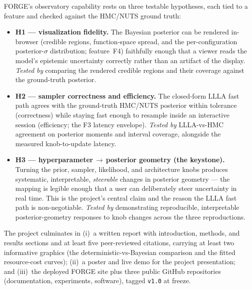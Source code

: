 \documentclass[11pt]{article}
\begin{document}
FORGE's observatory capability rests on three testable hypotheses, each tied to a feature and checked against the HMC/NUTS ground truth:
\begin{itemize}[nosep,leftmargin=1.4em]
  \item \textbf{H1 --- visualization fidelity.} The Bayesian posterior can be rendered in-browser (credible regions, function-space spread, and the per-configuration posterior-$\sigma$ distribution; feature~F4) faithfully enough that a viewer reads the model's epistemic uncertainty correctly rather than an artifact of the display. \emph{Tested by} comparing the rendered credible regions and their coverage against the ground-truth posterior.
  \item \textbf{H2 --- sampler correctness and efficiency.} The closed-form LLLA fast path agrees with the ground-truth HMC/NUTS posterior within tolerance (correctness) while staying fast enough to resample inside an interactive session (efficiency; the F3 latency envelope). \emph{Tested by} LLLA-vs-HMC agreement on posterior moments and interval coverage, alongside the measured knob-to-update latency.
  \item \textbf{H3 --- hyperparameter\,$\rightarrow$\,posterior geometry (the keystone).} Turning the prior, sampler, likelihood, and architecture knobs produces systematic, interpretable, \emph{steerable} changes in posterior geometry --- the mapping is legible enough that a user can deliberately steer uncertainty in real time. This is the project's central claim and the reason the LLLA fast path is non-negotiable. \emph{Tested by} demonstrating reproducible, interpretable posterior-geometry responses to knob changes across the three reproductions.
\end{itemize}

The project culminates in (i)~a written report with introduction, methods, and results sections and at least five peer-reviewed citations, carrying at least two informative graphics (the deterministic-vs-Bayesian comparison and the fitted resource-cost curves); (ii)~a poster and live demo for the project presentation; and (iii)~the deployed FORGE site plus three public GitHub repositories (documentation, experiments, software), tagged \texttt{v1.0} at freeze.
\end{document}
